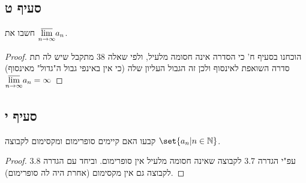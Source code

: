 \documentclass{article}
\DeclarePairedDelimiter\set\{\}
\begin{document}
	\subsection*{סעיף ט}
	חשבו את $\displaystyle{\varlimsup_{n \to \infty}} a_n$.
	\begin{proof}
		הוכחנו בסעיף ח' כי הסדרה אינה חסומה מלעיל, ולפי שאלה 38 מתקבל שיש לה תת סדרה השואפת לאינסוף ולכן זה הגבול העליון שלה (כי אין באינפי גבול ה"גדול" מאינסוף)
		$\displaystyle{\varlimsup_{n \to \infty}} a_n = \infty$
	\end{proof}

	\subsection*{סעיף י}
	קבעו האם קיימים סופרימום ומקסימום לקבוצה $\set{a_n | n \in \NN}$.
	\begin{proof}
		עפ"י הגדרה 3.7 לקבוצה שאינה חסומה מלעיל אין סופרימום.
		וביחד עם הגדרה 3.8 לקבוצה גם אין מקסימום (אחרת היה לה סופרימום).
	\end{proof}
\end{document}
